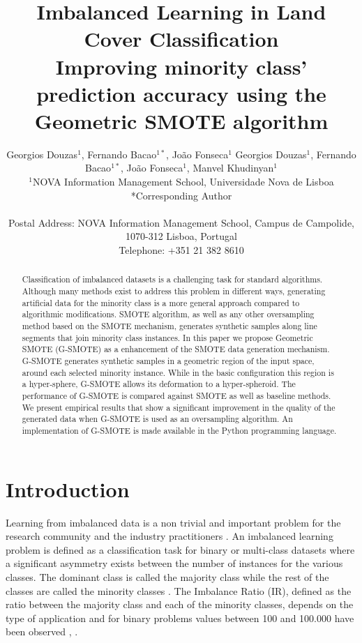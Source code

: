 \documentclass[parskip=full]{scrartcl}
\title{Imbalanced Learning in Land Cover Classification  \\ \LARGE{Improving minority class' prediction accuracy using the Geometric SMOTE algorithm}}
\author{
	Georgios Douzas\(^{1}\), Fernando Bacao\(^{1*}\), João Fonseca\(^{1}\)
	Georgios Douzas\(^{1}\), Fernando Bacao\(^{1*}\), João Fonseca\(^{1}\), Manvel Khudinyan\(^{1}\) 
	\\
	\small{\(^{1}\)NOVA Information Management School, Universidade Nova de Lisboa}
	\\
	\small{*Corresponding Author}
	\\
	\\
	\small{Postal Address: NOVA Information Management School, Campus de Campolide, 1070-312 Lisboa, Portugal}
	\\
	\small{Telephone: +351 21 382 8610}
}
\date{}
\begin{document}
\maketitle

\begin{abstract}
Classification of imbalanced datasets is a challenging task for standard
algorithms. Although many methods exist to address this problem in different
ways, generating artificial data for the minority class is a more general
approach compared to algorithmic modifications. SMOTE algorithm, as well as any
other oversampling method based on the SMOTE mechanism, generates synthetic
samples along line segments that join minority class instances. In this paper we
propose Geometric SMOTE (G-SMOTE) as a enhancement of the SMOTE data generation
mechanism. G-SMOTE generates synthetic samples in a geometric region of the
input space, around each selected minority instance. While in the basic
configuration this region is a hyper-sphere, G-SMOTE allows its deformation to a
hyper-spheroid. The performance of G-SMOTE is compared against SMOTE as well as
baseline methods. We present empirical results that show a significant
improvement in the quality of the generated data when G-SMOTE is used as an
oversampling algorithm. An implementation of G-SMOTE is made available in the
Python programming language.
\end{abstract}

\section{Introduction}
Learning from imbalanced data is a non trivial and important problem for the
research community and the industry practitioners \cite{Chawla2003}. An
imbalanced learning problem is defined as a classification task for binary or
multi-class datasets where a significant asymmetry exists between the number of
instances for the various classes. The dominant class is called the majority
class while the rest of the classes are called the minority classes
\cite{Chawla2003}. The Imbalance Ratio (IR), defined as the ratio between the
majority class and each of the minority classes, depends on the type of
application and for binary problems values between 100 and 100.000 have been
observed \cite{Chawla2002}, \cite{Barua2014}.
\end{document}
